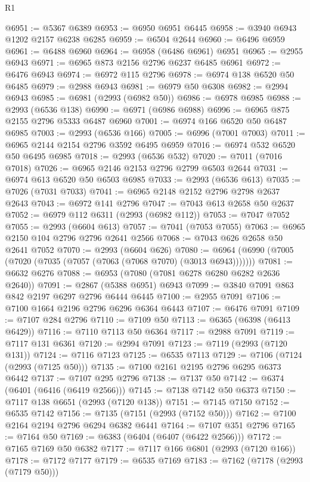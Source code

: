 \begin{lexlean}{R1}
\begin{coremodule}
@6951 := @5367 @6389
@6953 := @6950 @6951 @6445
@6958 := @3940 @6943 @1202 @2157 @6238 @6285
@6959 := @6504 @2644
@6960 := @6496 @6959
@6961 := @6488 @6960
@6964 := @6958 (@6486 @6961) @6951
@6965 := @2955 @6943
@6971 := @6965 @873 @2156 @2796 @6237 @6485 @6961
@6972 := @6476 @6943
@6974 := @6972 @115 @2796
@6978 := @6974 @138 @6520 @50 @6485
@6979 := @2988 @6943
@6981 := @6979 @50 @6308
@6982 := @2994 @6943
@6985 := @6981 (@2993 (@6982 @50))
@6986 := @6978 @6985
@6988 := @2993 (@6536 @138)
@6990 := @6971 (@6986 @6988)
@6996 := @6965 @875 @2155 @2796 @5333 @6487 @6960
@7001 := @6974 @166 @6520 @50 @6487 @6985
@7003 := @2993 (@6536 @166)
@7005 := @6996 (@7001 @7003)
@7011 := @6965 @2144 @2154 @2796 @3592 @6495 @6959
@7016 := @6974 @532 @6520 @50 @6495 @6985
@7018 := @2993 (@6536 @532)
@7020 := @7011 (@7016 @7018)
@7026 := @6965 @2146 @2153 @2796 @2799 @6503 @2644
@7031 := @6974 @613 @6520 @50 @6503 @6985
@7033 := @2993 (@6536 @613)
@7035 := @7026 (@7031 @7033)
@7041 := @6965 @2148 @2152 @2796 @2798 @2637 @2643
@7043 := @6972 @141 @2796
@7047 := @7043 @613 @2658 @50 @2637
@7052 := @6979 @112 @6311 (@2993 (@6982 @112))
@7053 := @7047 @7052
@7055 := @2993 (@6604 @613)
@7057 := @7041 (@7053 @7055)
@7063 := @6965 @2150 @104 @2796 @2796 @2641 @2566
@7068 := @7043 @626 @2658 @50 @2641 @7052
@7070 := @2993 (@6604 @626)
@7080 := @6964 (@6990 (@7005 (@7020 (@7035 (@7057 (@7063 (@7068 @7070) (@3013 @6943)))))))
@7081 := @6632 @6276
@7088 := @6953 (@7080 (@7081 @6278 @6280 @6282 @2636 @2640))
@7091 := @2867 (@5388 @6951) @6943
@7099 := @3840 @7091 @863 @842 @2197 @6297 @2796 @6444 @6445
@7100 := @2955 @7091
@7106 := @7100 @1664 @2196 @2796 @6296 @6364 @6443
@7107 := @6476 @7091
@7109 := @7107 @284 @2796
@7110 := @7109 @50
@7113 := @6365 (@6398 (@6413 @6429))
@7116 := @7110 @7113 @50 @6364
@7117 := @2988 @7091
@7119 := @7117 @131 @6361
@7120 := @2994 @7091
@7123 := @7119 (@2993 (@7120 @131))
@7124 := @7116 @7123
@7125 := @6535 @7113
@7129 := @7106 (@7124 (@2993 (@7125 @50)))
@7135 := @7100 @2161 @2195 @2796 @6295 @6373 @6442
@7137 := @7107 @295 @2796
@7138 := @7137 @50
@7142 := @6374 (@6401 (@6416 (@6419 @2566)))
@7145 := @7138 @7142 @50 @6373
@7150 := @7117 @138 @6651 (@2993 (@7120 @138))
@7151 := @7145 @7150
@7152 := @6535 @7142
@7156 := @7135 (@7151 (@2993 (@7152 @50)))
@7162 := @7100 @2164 @2194 @2796 @6294 @6382 @6441
@7164 := @7107 @351 @2796
@7165 := @7164 @50
@7169 := @6383 (@6404 (@6407 (@6422 @2566)))
@7172 := @7165 @7169 @50 @6382
@7177 := @7117 @166 @6801 (@2993 (@7120 @166))
@7178 := @7172 @7177
@7179 := @6535 @7169
@7183 := @7162 (@7178 (@2993 (@7179 @50)))

\end{coremodule}
\end{lexlean}
